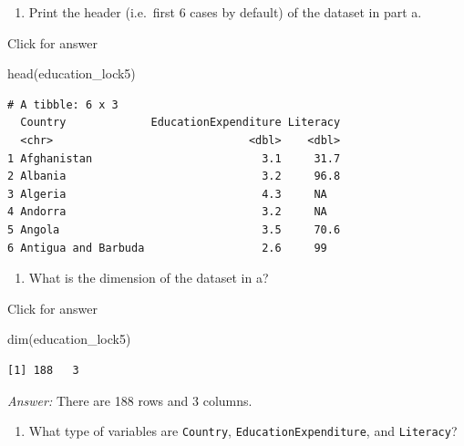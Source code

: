 \documentclass[
]{book}
\newenvironment{Shaded}{\begin{snugshade}}{\end{snugshade}}
\newcommand{\FunctionTok}[1]{\textcolor[rgb]{0.00,0.00,0.00}{#1}}
\newcommand{\NormalTok}[1]{#1}
\providecommand{\tightlist}{%
  \setlength{\itemsep}{0pt}\setlength{\parskip}{0pt}}
\begin{document}
\begin{enumerate}
\def\labelenumi{\alph{enumi}.}
\setcounter{enumi}{1}
\tightlist
\item
  Print the header (i.e.~first 6 cases by default) of the dataset in part a.
\end{enumerate}

Click for answer

\begin{Shaded}
\begin{Highlighting}[]
\FunctionTok{head}\NormalTok{(education\_lock5)}
\end{Highlighting}
\end{Shaded}

\begin{verbatim}
# A tibble: 6 x 3
  Country             EducationExpenditure Literacy
  <chr>                              <dbl>    <dbl>
1 Afghanistan                          3.1     31.7
2 Albania                              3.2     96.8
3 Algeria                              4.3     NA  
4 Andorra                              3.2     NA  
5 Angola                               3.5     70.6
6 Antigua and Barbuda                  2.6     99  
\end{verbatim}

\begin{enumerate}
\def\labelenumi{\alph{enumi}.}
\setcounter{enumi}{2}
\tightlist
\item
  What is the dimension of the dataset in a?
\end{enumerate}

Click for answer

\begin{Shaded}
\begin{Highlighting}[]
\FunctionTok{dim}\NormalTok{(education\_lock5)}
\end{Highlighting}
\end{Shaded}

\begin{verbatim}
[1] 188   3
\end{verbatim}

\emph{Answer:} There are 188 rows and 3 columns.

\begin{enumerate}
\def\labelenumi{\alph{enumi}.}
\setcounter{enumi}{3}
\tightlist
\item
  What type of variables are \texttt{Country}, \texttt{EducationExpenditure}, and \texttt{Literacy}?
\end{enumerate}
\end{document}
